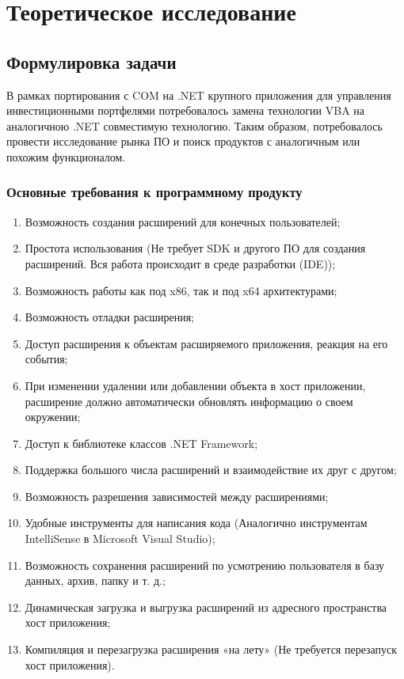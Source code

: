 \section{Теоретическое исследование}




\subsection{Формулировка задачи}

В рамках портирования с COM на .NET крупного приложения для управления инвестиционными портфелями потребовалось замена технологии VBA на аналогичною .NET совместимую технологию. Таким образом, потребовалось провести исследование рынка ПО и поиск продуктов с аналогичным или похожим функционалом.

\subsubsection{Основные требования к программному продукту}
\label{sec:requirements}
\begin{enumerate}
\item Возможность создания расширений для конечных пользователей;
\item Простота использования (Не требует SDK и другого ПО для создания расширений. Вся работа происходит в среде разработки (IDE));
\item Возможность работы как под x86, так и под x64 архитектурами;
\item Возможность отладки расширения;
\item Доступ расширения к объектам расширяемого приложения, реакция на его события;
\item При изменении удалении или добавлении объекта в хост приложении, расширение должно автоматически обновлять информацию о своем окружении;
\item Доступ к библиотеке классов .NET Framework;
\item Поддержка большого числа расширений и взаимодействие их друг с другом;
\item Возможность разрешения зависимостей между расширениями;
\item Удобные инструменты для написания кода (Аналогично инструментам IntelliSense в Microsoft Visual Studio);
\item Возможность сохранения расширений по усмотрению пользователя в базу данных, архив, папку и т. д.;
\item Динамическая загрузка и выгрузка расширений из адресного пространства хост приложения;
\item Компиляция и перезагрузка расширения «на лету» (Не требуется перезапуск хост приложения).
\end{enumerate}




\pagebreak